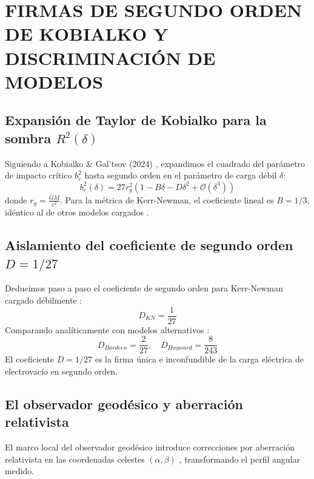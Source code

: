 \chapter{FIRMAS DE SEGUNDO ORDEN DE KOBIALKO Y DISCRIMINACIÓN DE MODELOS}

\section{Expansión de Taylor de Kobialko para la sombra \texorpdfstring{$R^2(\delta)$}{R^2(delta)}}
Siguiendo a Kobialko \& Gal'tsov (2024) \citep{perturbaciones_en_bh}, expandimos el cuadrado del parámetro de impacto crítico $b_c^2$ hasta segundo orden en el parámetro de carga débil $\delta$:
\begin{equation}
    b_c^2(\delta) = 27 r_g^2 \left( 1 - B \delta - D \delta^2 + \mathcal{O}(\delta^3) \right)
    \label{eq:kobialko_expansion_SI}
\end{equation}
donde $r_g = \frac{GM}{c^2}$. Para la métrica de Kerr-Newman, el coeficiente lineal es $B = 1/3$, idéntico al de otros modelos cargados \citep{perturbaciones_en_bh}.

\section{Aislamiento del coeficiente de segundo orden \texorpdfstring{$D = 1/27$}{D = 1/27}}
Deducimos paso a paso el coeficiente de segundo orden para Kerr-Newman cargado débilmente \citep{perturbaciones_en_bh}:
\begin{equation}
    D_{KN} = \frac{1}{27}
\end{equation}
Comparando analíticamente con modelos alternativos \citep{perturbaciones_en_bh}:
\begin{equation}
    D_{Bardeen} = \frac{2}{27}, \quad D_{Hayward} = \frac{8}{243}
\end{equation}
El coeficiente $D = 1/27$ es la firma única e inconfundible de la carga eléctrica de electrovacío en segundo orden.

\section{El observador geodésico y aberración relativista}
El marco local del observador geodésico introduce correcciones por aberración relativista en las coordenadas celestes $(\alpha, \beta)$ \citep{shadows_quintessence_bh, Achour_2025_J._Cosmol._Astropart._Phys._2025_012}, transformando el perfil angular medido.
